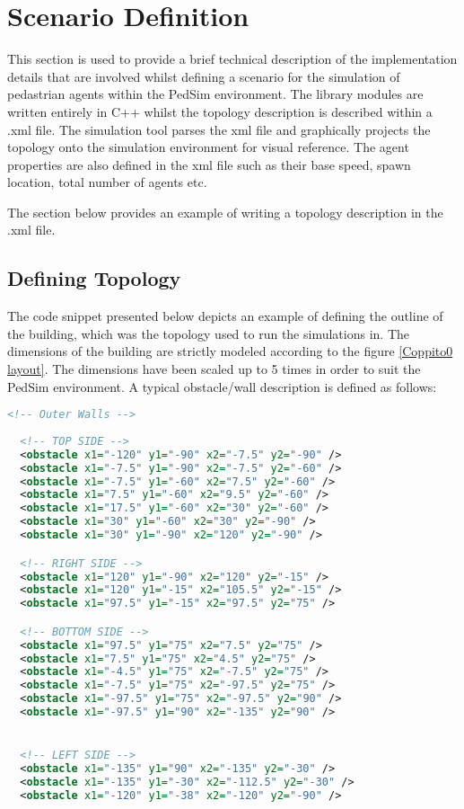 \chapter{Scenario Definition\label{ch:Scenario Definition}}

This section is used to provide a brief technical description of the implementation details that are involved whilst defining a scenario for the simulation of pedastrian agents within the PedSim environment. The library modules are written entirely in C++ whilst the topology description is described within a .xml file. The simulation tool parses the xml file and graphically projects the topology onto the simulation environment for visual reference.
The agent properties are also defined in the xml file such as their base speed, spawn location, total number of agents etc.

The section below provides an example of writing a topology description in the .xml file.

\section{Defining Topology}

The code snippet presented below depicts an example of defining the outline of the building, which was the topology used to run the simulations in. The dimensions of the building are strictly modeled according to the figure \ref{Coppito0 layout}. The dimensions have been scaled up to 5 times in order to suit the PedSim environment. A typical obstacle/wall description is defined as follows:
\\

\begin{lstlisting}[language=xml]
  <!-- Outer Walls -->
  
  <!-- TOP SIDE -->
  <obstacle x1="-120" y1="-90" x2="-7.5" y2="-90" />
  <obstacle x1="-7.5" y1="-90" x2="-7.5" y2="-60" />
  <obstacle x1="-7.5" y1="-60" x2="7.5" y2="-60" />
  <obstacle x1="7.5" y1="-60" x2="9.5" y2="-60" />
  <obstacle x1="17.5" y1="-60" x2="30" y2="-60" />
  <obstacle x1="30" y1="-60" x2="30" y2="-90" />
  <obstacle x1="30" y1="-90" x2="120" y2="-90" />

  <!-- RIGHT SIDE -->
  <obstacle x1="120" y1="-90" x2="120" y2="-15" />
  <obstacle x1="120" y1="-15" x2="105.5" y2="-15" />
  <obstacle x1="97.5" y1="-15" x2="97.5" y2="75" />

  <!-- BOTTOM SIDE -->
  <obstacle x1="97.5" y1="75" x2="7.5" y2="75" />
  <obstacle x1="7.5" y1="75" x2="4.5" y2="75" />
  <obstacle x1="-4.5" y1="75" x2="-7.5" y2="75" />
  <obstacle x1="-7.5" y1="75" x2="-97.5" y2="75" />
  <obstacle x1="-97.5" y1="75" x2="-97.5" y2="90" />
  <obstacle x1="-97.5" y1="90" x2="-135" y2="90" />


  <!-- LEFT SIDE -->
  <obstacle x1="-135" y1="90" x2="-135" y2="-30" />
  <obstacle x1="-135" y1="-30" x2="-112.5" y2="-30" />
  <obstacle x1="-120" y1="-38" x2="-120" y2="-90" />

\end{lstlisting}

